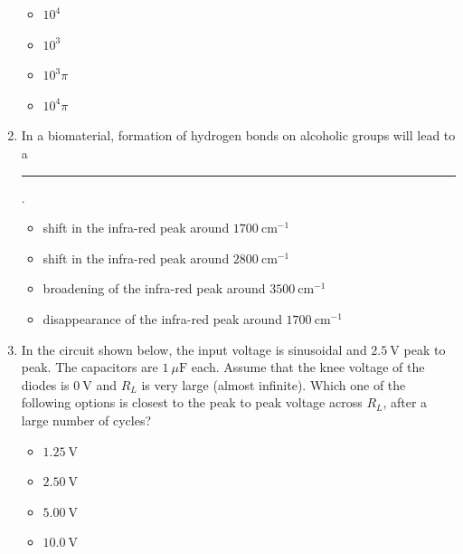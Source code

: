 \documentclass[journal]{IEEEtran}
\begin{document}
\begin{enumerate}
\begin{itemize}
    \item \(10^4\)
    \item \(10^3\)
    \item \(10^3\pi\)
    \item \(10^4\pi\)
\end{itemize}


\item  
In a biomaterial, formation of hydrogen bonds on alcoholic groups will lead to a \rule{3cm}{0.15mm}.
\hfill{}
\begin{itemize}
    \item shift in the infra-red peak around \(1700~\text{cm}^{-1}\)
    \item shift in the infra-red peak around \(2800~\text{cm}^{-1}\)
    \item broadening of the infra-red peak around \(3500~\text{cm}^{-1}\)
    \item disappearance of the infra-red peak around \(1700~\text{cm}^{-1}\)
\end{itemize}


\item  
In the circuit shown below, the input voltage is sinusoidal and \(2.5~\text{V}\) peak to peak. The capacitors are \(1~\mu\text{F}\) each. Assume that the knee voltage of the diodes is \(0~\text{V}\) and \(R_L\) is very large (almost infinite). Which one of the following options is closest to the peak to peak voltage across \(R_L\), after a large number of cycles?

\begin{figure}[H]
\centering
{}%

\label{fig:my_label}
\end{figure}
\begin{itemize}
    \item \(1.25~\text{V}\)
    \item \(2.50~\text{V}\)
    \item \(5.00~\text{V}\)
    \item \(10.0~\text{V}\)
\end{itemize}
\hfill{}


\end{enumerate}
\end{document}
